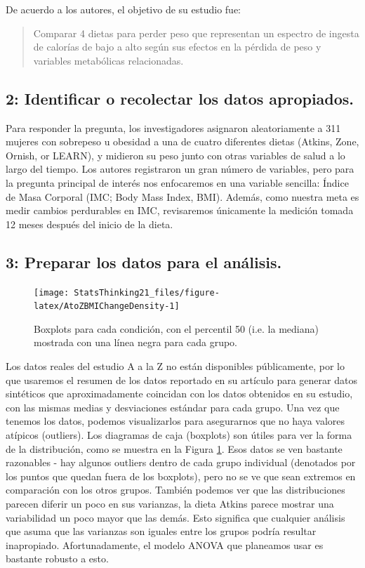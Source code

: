 \documentclass[
  12pt,
]{book}
\begin{document}
De acuerdo a los autores, el objetivo de su estudio fue:

\begin{quote}
Comparar 4 dietas para perder peso que representan un espectro de ingesta de calorías de bajo a alto según sus efectos en la pérdida de peso y variables metabólicas relacionadas.
\end{quote}

\hypertarget{identificar-o-recolectar-los-datos-apropiados.}{%
\subsection{2: Identificar o recolectar los datos apropiados.}\label{identificar-o-recolectar-los-datos-apropiados.}}

Para responder la pregunta, los investigadores asignaron aleatoriamente a 311 mujeres con sobrepeso u obesidad a una de cuatro diferentes dietas (Atkins, Zone, Ornish, or LEARN), y midieron su peso junto con otras variables de salud a lo largo del tiempo. Los autores registraron un gran número de variables, pero para la pregunta principal de interés nos enfocaremos en una variable sencilla: Índice de Masa Corporal (IMC; Body Mass Index, BMI). Además, como nuestra meta es medir cambios perdurables en IMC, revisaremos únicamente la medición tomada 12 meses después del inicio de la dieta.

\hypertarget{preparar-los-datos-para-el-anuxe1lisis.}{%
\subsection{3: Preparar los datos para el análisis.}\label{preparar-los-datos-para-el-anuxe1lisis.}}

\begin{figure}
\texttt{[image: StatsThinking21\_files/figure-latex/AtoZBMIChangeDensity-1]} \caption{Boxplots para cada condición, con el percentil 50 (i.e. la mediana) mostrada con una línea negra para cada grupo.}\label{fig:AtoZBMIChangeDensity}
\end{figure}

Los datos reales del estudio A a la Z no están disponibles públicamente, por lo que usaremos el resumen de los datos reportado en su artículo para generar datos sintéticos que aproximadamente coincidan con los datos obtenidos en su estudio, con las mismas medias y desviaciones estándar para cada grupo. Una vez que tenemos los datos, podemos visualizarlos para asegurarnos que no haya valores atípicos (outliers). Los diagramas de caja (boxplots) son útiles para ver la forma de la distribución, como se muestra en la Figura \ref{fig:AtoZBMIChangeDensity}. Esos datos se ven bastante razonables - hay algunos outliers dentro de cada grupo individual (denotados por los puntos que quedan fuera de los boxplots), pero no se ve que sean extremos en comparación con los otros grupos. También podemos ver que las distribuciones parecen diferir un poco en sus varianzas, la dieta Atkins parece mostrar una variabilidad un poco mayor que las demás. Esto significa que cualquier análisis que asuma que las varianzas son iguales entre los grupos podría resultar inapropiado. Afortunadamente, el modelo ANOVA que planeamos usar es bastante robusto a esto.
\end{document}
